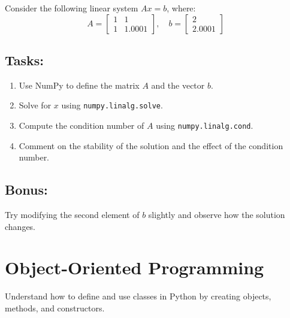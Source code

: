 \documentclass[11pt]{article}
\begin{document}
Consider the following linear system \( Ax = b \), where:
\[
A = \begin{bmatrix}
1 & 1 \\
1 & 1.0001
\end{bmatrix},
\quad
b = \begin{bmatrix}
2 \\
2.0001
\end{bmatrix}
\]

\subsection*{Tasks:}
\begin{enumerate}
\item Use NumPy to define the matrix \( A \) and the vector \( b \).
\item Solve for \( x \) using \lstinline[language=python]{numpy.linalg.solve}.
\item Compute the condition number of \( A \) using \lstinline[language=python]{numpy.linalg.cond}.
\item Comment on the stability of the solution and the effect of the condition number.
\end{enumerate}

\subsection*{Bonus:}
Try modifying the second element of \( b \) slightly and observe how the solution changes.




\section*{Object-Oriented Programming}
Understand how to define and use classes in Python by creating objects, methods, and constructors.
\end{document}
